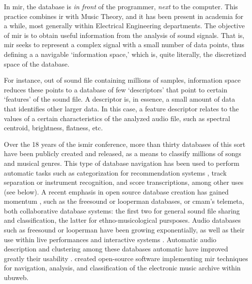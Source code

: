 
In \gls{mir}, the database is \textit{in front} of the programmer, \textit{next} to the computer. This practice combines \gls{ir} with Music Theory, and it has been present in academia for a while, most generally within Electrical Engineering departments. The objective of \gls{mir} is to obtain useful information from the analysis of sound signals. That is, \gls{mir} seeks to represent a complex signal with a small number of data points, thus defining a a navigable `information space,' which is, quite literally, the discretized space of the database.


For instance, out of sound file containing millions of samples, information space reduces these points to a database of few `descriptors' that point to certain `features' of the sound file. A descriptor is, in essence, a small amount of data that identifies other larger data. In this case, a feature descriptor relates to the values of a certain characteristics of the analyzed audio file, such as spectral centroid, brightness, flatness, etc. 

Over the 18 years of the \gls{ismir} conference, more than thirty databases of this sort have been publicly created and released, as a means to classify millions of songs and musical genres. This type of database navigation has been used to perform automatic tasks such as categorization for recommendation systems \parencites{Tza02:Mus}{DBLP:journals/corr/abs-0812-4235}{asmita_poddar_2018_1422565}, track separation or instrument recognition, and score transcriptions, among other uses (see below). A recent emphasis in open source database creation has gained momentum \parencite{DBLP:conf/ismir/FonsecaPFFBFOPS17}, such as the \gls{freesound} or \gls{looperman} databases, or \gls{cmam}'s \gls{telemeta}, both collaborative database systems: the first two for general sound file sharing and classification, the latter for ethno-musicological pursposes. Audio databases such as \gls{freesound} or \gls{looperman} have been growing exponentially, as well as their use within live performances and interactive systems \parencite{nuno_n_correia_2010_849729}. Automatic audio description and clustering among these databases automatic have improved greatly their usability \parencite{gerard_roma_2012_850102}. \textcite{collins_2015} created open-source software implementing \gls{mir} techniques for navigation, analysis, and classification of the electronic music archive within \gls{ubuweb}. 

